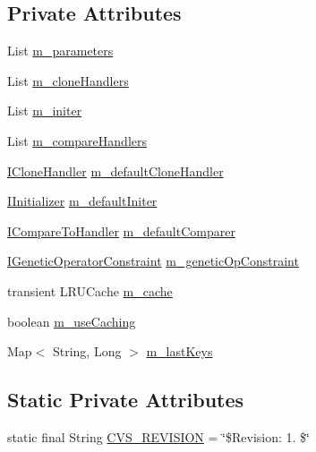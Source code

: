 \subsection*{Private Attributes}
\begin{DoxyCompactItemize}
\item 
List \hyperlink{classorg_1_1jgap_1_1impl_1_1_j_g_a_p_factory_a52a35147b7ec2d03ed2a3597dc1aa9c2}{m\-\_\-parameters}
\item 
List \hyperlink{classorg_1_1jgap_1_1impl_1_1_j_g_a_p_factory_aa72d03a5a931de8e72b11a597a7d7d3a}{m\-\_\-clone\-Handlers}
\item 
List \hyperlink{classorg_1_1jgap_1_1impl_1_1_j_g_a_p_factory_a123bf40f2b4b228c2d79f1c28dd98dbc}{m\-\_\-initer}
\item 
List \hyperlink{classorg_1_1jgap_1_1impl_1_1_j_g_a_p_factory_ae81abfbce4a339cd1b928df0aa5a5e1c}{m\-\_\-compare\-Handlers}
\item 
\hyperlink{interfaceorg_1_1jgap_1_1_i_clone_handler}{I\-Clone\-Handler} \hyperlink{classorg_1_1jgap_1_1impl_1_1_j_g_a_p_factory_a4e813188a3eb70a310cf1516e99f9d68}{m\-\_\-default\-Clone\-Handler}
\item 
\hyperlink{interfaceorg_1_1jgap_1_1_i_initializer}{I\-Initializer} \hyperlink{classorg_1_1jgap_1_1impl_1_1_j_g_a_p_factory_ab3c5ae39ff5fab63191ea71bcd7aa083}{m\-\_\-default\-Initer}
\item 
\hyperlink{interfaceorg_1_1jgap_1_1_i_compare_to_handler}{I\-Compare\-To\-Handler} \hyperlink{classorg_1_1jgap_1_1impl_1_1_j_g_a_p_factory_aceff8aab7df3263c82802832355840de}{m\-\_\-default\-Comparer}
\item 
\hyperlink{interfaceorg_1_1jgap_1_1_i_genetic_operator_constraint}{I\-Genetic\-Operator\-Constraint} \hyperlink{classorg_1_1jgap_1_1impl_1_1_j_g_a_p_factory_a3693b9066d03ed3d0856b1d9ced4cf9e}{m\-\_\-genetic\-Op\-Constraint}
\item 
transient L\-R\-U\-Cache \hyperlink{classorg_1_1jgap_1_1impl_1_1_j_g_a_p_factory_a911c06721c6b6d8f4bc21d9cb6125595}{m\-\_\-cache}
\item 
boolean \hyperlink{classorg_1_1jgap_1_1impl_1_1_j_g_a_p_factory_a244e1f88d3462188bc600075bdd0854d}{m\-\_\-use\-Caching}
\item 
Map$<$ String, Long $>$ \hyperlink{classorg_1_1jgap_1_1impl_1_1_j_g_a_p_factory_a1ad6ea0257ae0a732bfd367f2dc65b3b}{m\-\_\-last\-Keys}
\end{DoxyCompactItemize}
\subsection*{Static Private Attributes}
\begin{DoxyCompactItemize}
\item 
static final String \hyperlink{classorg_1_1jgap_1_1impl_1_1_j_g_a_p_factory_aab2b45f2c63fb02ec26ffdc07213c29d}{C\-V\-S\-\_\-\-R\-E\-V\-I\-S\-I\-O\-N} = \char`\"{}\$Revision\-: 1. \$\char`\"{}
\end{DoxyCompactItemize}
